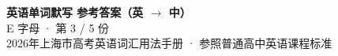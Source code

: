 \documentclass[10pt,a4paper]{article}
\begin{document}
\pagestyle{plain}

\begin{center}
{\LARGE\bfseries 英语单词默写 \quad 参考答案（英 $\to$ 中）}\\[0.22em]
{\large E 字母 · 第 3 / 5 份}\\[0.18em]
{\small 2026年上海市高考英语词汇用法手册 · 参照普通高中英语课程标准}
\end{center}

\vspace{0.2em}
\noindent{\color{rulegray}\rule{\textwidth}{0.8pt}}

\vspace{0.35em}

\vspace{0.25em}
\renewcommand{\arraystretch}{1.32}
\end{document}
